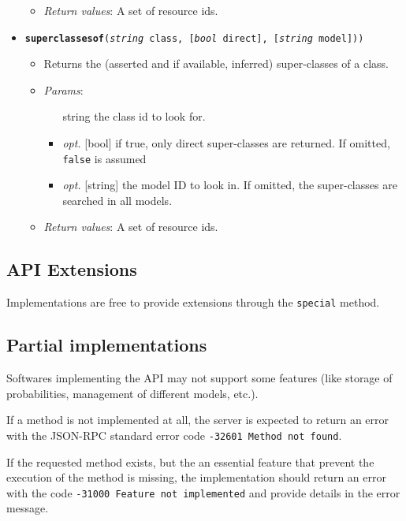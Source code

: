 \begin{itemize}
\begin{itemize}
\item  \emph{Return values}: A set of resource ids.
\end{itemize}

\item  \texttt{\textbf{superclassesof}(\emph{string} class, [\emph{bool} direct], [\emph{string} model]))}
\begin{itemize}
\item  Returns the (asserted and if available, inferred) super-classes of a class.
\item  \emph{Params}:
\begin{itemize}
\item  [string] the class id to look for.
\item  \emph{opt.} [bool] if true, only direct super-classes are returned. If omitted, \texttt{false} is assumed 
\item  \emph{opt.} [string] the model ID to look in. If omitted, the super-classes are searched in all models. 
\end{itemize}

\item  \emph{Return values}: A set of resource ids.
\end{itemize}

\end{itemize}

\subsection{API Extensions}


Implementations are free to provide extensions through the \texttt{special} method.


\subsection{Partial implementations}


Softwares implementing the API may not support some features (like storage of probabilities, management of different models, etc.).

If a method is not implemented at all, the server is expected to return an error with the JSON-RPC standard error code \texttt{-32601 Method not found}.

If the requested method exists, but the an essential feature that prevent the execution of the method is missing, the implementation should return an error with the code \texttt{-31000 Feature not implemented} and provide details in the error message.

